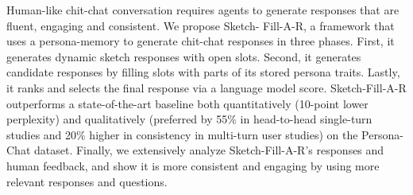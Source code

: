 Human-like chit-chat conversation requires agents to generate responses that are fluent, engaging and consistent. We propose Sketch- Fill-A-R, a framework that uses a persona-memory to generate chit-chat responses in three phases. First, it generates dynamic sketch responses with open slots. Second, it generates candidate responses by filling slots with parts of its stored persona traits. Lastly, it ranks and selects the final response via a language model score. Sketch-Fill-A-R outperforms a state-of-the-art baseline both quantitatively (10-point lower perplexity) and qualitatively (preferred by 55\% in head-to-head single-turn studies and 20\% higher in consistency in multi-turn user studies) on the Persona-Chat dataset. Finally, we extensively analyze Sketch-Fill-A-R's responses and human feedback, and show it is more consistent and engaging by using more relevant responses and questions.
